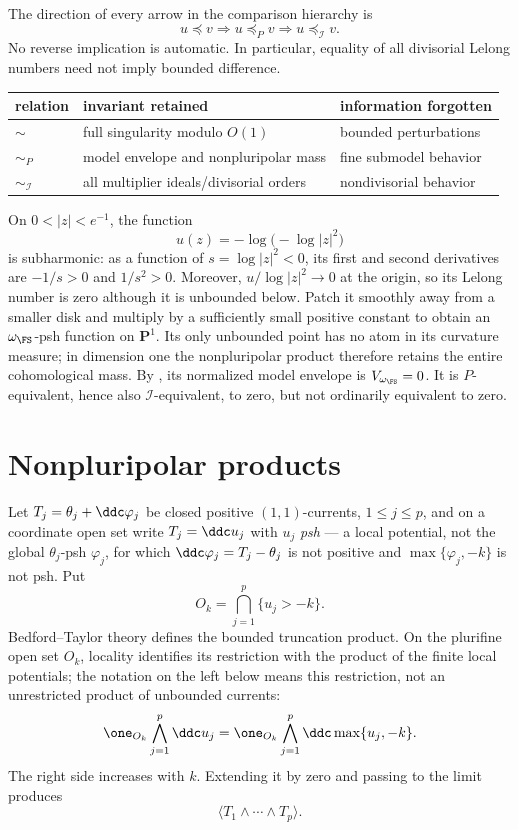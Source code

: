 The direction of every arrow in the comparison hierarchy is
\[
            u\preceq v
            \Longrightarrow
            u\preceq_Pv
            \Longrightarrow
            u\preceq_{\mathcal I}v.
\]
No reverse implication is automatic. In particular, equality of all
divisorial Lelong numbers need not imply bounded difference.

\begin{center}
\begin{tabular}{lll}
\toprule
relation & invariant retained & information forgotten\\
\midrule
\(\sim\) & full singularity modulo \(O(1)\) & bounded perturbations\\
\(\sim_P\) & model envelope and nonpluripolar mass & fine submodel behavior\\
\(\sim_{\mathcal I}\) & all multiplier ideals/divisorial orders &
nondivisorial behavior\\
\bottomrule
\end{tabular}
\end{center}

\begin{example}
\label{ex:appH-loglog}
On \(0<|z|<e^{-1}\), the function
\[
                         u(z)=-\log\bigl(-\log|z|^2\bigr)
\]
is subharmonic: as a function of \(s=\log|z|^2<0\), its first and second
derivatives are \(-1/s>0\) and \(1/s^2>0\).  Moreover,
\(u/\log|z|^2\to0\) at the origin, so its Lelong number is zero although
it is unbounded below.  Patch it smoothly away from a smaller disk and
multiply by a sufficiently small positive constant to obtain an
\(\omega_{\FS}\)-psh function on \(\mathbf P^1\).  Its only unbounded
point has no atom in its curvature measure; in dimension one the
nonpluripolar product therefore retains the entire cohomological mass.
By , its normalized model envelope is
\(V_{\omega_{\FS}}=0\).  It is \(P\)-equivalent, hence also
\(\mathcal I\)-equivalent, to zero, but not ordinarily equivalent to zero.
\end{example}

\section{Nonpluripolar products}
\label{sec:appH-npp}

Let \(T_j=\theta_j+\ddc\varphi_j\) be closed positive \((1,1)\)-currents,
\(1\leq j\leq p\), and on a coordinate open set write \(T_j=\ddc u_j\) with
\(u_j\) \emph{psh} --- a local potential, not the global
\(\theta_j\)-psh \(\varphi_j\), for which \(\ddc\varphi_j=T_j-\theta_j\) is
not positive and \(\max\{\varphi_j,-k\}\) is not psh.  Put
\[
 O_k=\bigcap_{j=1}^p\{u_j>-k\}.
\]
Bedford--Taylor theory defines the bounded truncation product.  On the
plurifine open set \(O_k\), locality identifies its restriction with the
product of the finite local potentials; the notation on the left below
means this restriction, not an unrestricted product of unbounded currents:
\[
 \one_{O_k}\bigwedge_{j=1}^p\ddc u_j
 =
 \one_{O_k}\bigwedge_{j=1}^p\ddc\max\{u_j,-k\}.
\]
The right side increases with \(k\). Extending it by zero and passing to
the limit produces
\[
                    \langle T_1\wedge\cdots\wedge T_p\rangle.
\]

